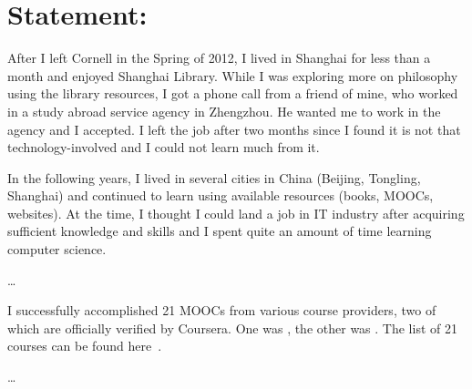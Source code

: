 


\usepackage[font={scriptsize,it}]{caption}
\usepackage{metalogo,alltt,soul,tikz,standalone,wrapfig,csquotes}
\usetikzlibrary{calc}
\usepackage[sorting=none]{biblatex}



\newcommand*{\onum}[1]{{\addfontfeatures{Numbers=OldStyle}#1}}
\newcommand*{\TikZ}{PGF/\kern1bpTi\kern.5bp\textit{k}Z}


	\section*{Statement:}
	After I left Cornell in the Spring of 2012, I lived in Shanghai for less than a month and enjoyed Shanghai Library. While I was exploring more on philosophy using the library resources, I got a phone call from a friend of mine, who worked in a study abroad service agency in Zhengzhou. He wanted me to work in the agency and I accepted. I left the job after two months since I found it is not that technology-involved and I could not learn much from it.
	
	In the following years, I lived in several cities in China (Beijing, Tongling, Shanghai) and continued to learn using available resources (books, MOOCs, websites). At the time, I thought I could land a job in IT industry after acquiring sufficient knowledge and skills and I spent quite an amount of time learning computer science.
	
	
	\dots
	
	I successfully accomplished 21 MOOCs from various course providers, two of which are officially verified by Coursera. One was \textcite{LLI2}, the other was \textcite{FPPS}. The list of 21 courses can be found here~\cite{accredible}.
	
	\dots
	
